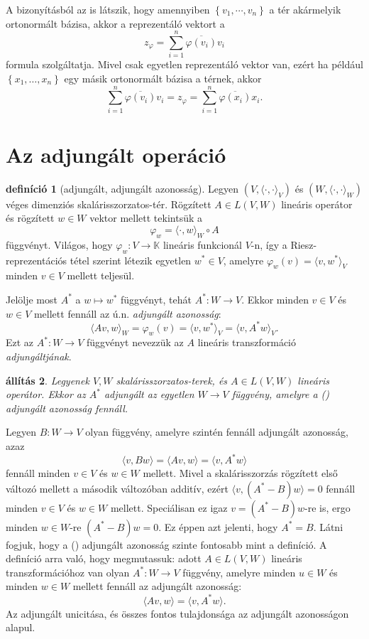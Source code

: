 \documentclass[9pt, a4paper, showtrims]{memoir}
\makeatletter
\renewenvironment{proof}[1][\proofname]
    {\par\pushQED{\qed}%
    \normalfont \topsep6\p@\@plus6\p@\relax
    \trivlist
    \item[\hskip\labelsep
        \itshape
    #1\@addpunct{:}]\ignorespaces}
    {\popQED\endtrivlist\@endpefalse}
\theoremstyle{plain}
\newtheorem{proposition}{állítás}[chapter]
\theoremstyle{remark}
\theoremstyle{definition}
\newtheorem{definition}[proposition]{definíció}
\newcommand{\ip}[2]{\langle#1,#2\rangle}
\makeatother
\begin{document}
A bizonyításból az is látszik, hogy amennyiben 
$\left\{ v_1,\cdots,v_n \right\}$ a tér akármelyik ortonormált bázisa,
akkor a reprezentáló vektort a 
\[
    z_\varphi=
    \sum_{i=1}^n\overline{\varphi\left( v_i \right)}v_i
\]
formula szolgáltatja.
Mivel csak egyetlen reprezentáló vektor van, ezért ha például 
$\left\{ x_1,\dots,x_n \right\}$ egy másik ortonormált bázisa a térnek,
akkor
\[
    \sum_{i=1}^n\overline{\varphi\left( v_i \right)}v_i
    =
    z_\varphi
    =
    \sum_{i=1}^n\overline{\varphi\left( x_i \right)}x_i.
\]
\section{Az adjungált operáció}
\begin{definition}[adjungált, adjungált azonosság]
Legyen $\left( V,\ip{\cdot}{\cdot}_V \right)$ és
$\left( W,\ip{\cdot}{\cdot}_W \right)$ véges dimenziós ska\-láris\-szor\-zatos-tér.
Rögzített $A\in L\left( V,W \right)$ lineáris operátor és rögzített $w\in W$ vektor mellett tekintsük a 
\[
    \varphi_w=
    \ip{\cdot}{w}_W\circ A
\]
függvényt. 
Világos, hogy $\varphi_w:V\to\mathbb{K}$ lineáris funkcionál $V$-n, 
így a Riesz-reprezentációs tétel szerint létezik egyetlen $w^\ast\in V$, 
amelyre
$\varphi_w\left( v \right)=\ip{v}{w^\ast}_V$ minden $v\in V$ mellett teljesül.

Jelölje most $A^\ast$ a $w\mapsto w^\ast$ függvényt, tehát
$A^\ast:W\to V$.
Ekkor minden $v\in V$ és $w\in V$ mellett fennáll az ú.n. \emph{adjungált azonosság}:
\[
    \ip{Av}{w}_W
    =
    \varphi_w\left( v \right)
    =
    \ip{v}{w^\ast}_V
    =
    \ip{v}{A^\ast w}_V.\tag{\dag}
\]
Ezt az $A^\ast:W\to V$ függvényt nevezzük az $A$ lineáris transzformáció \emph{adjungáltjának}.
\end{definition}
\begin{proposition}
    Legyenek $V,W$ skalárisszorzatos-terek, és $A\in L\left( V,W \right)$ lineáris operátor.
    Ekkor az $A^\ast$ adjungált az egyetlen $W\to V$ függvény,
    amelyre a (\dag) adjungált azonosság fennáll.
\end{proposition}
\begin{proof}
    Legyen $B:W\to V$ olyan függvény, amelyre szintén fennáll adjungált azonosság,
    azaz
    \[
        \ip{v}{Bw}
        =
        \ip{Av}{w}
        =
        \ip{v}{A^\ast w}
    \]
    fennáll minden $v\in V$ és $w\in W$ mellett.
    Mivel a skalárisszorzás rögzített első változó mellett a második változóban additív, 
    ezért 
    $\ip{v}{\left( A^\ast-B \right)w}=0$ fennáll minden $v\in V$ és $w\in W$ mellett.
    Speciálisan ez igaz $v=\left( A^\ast-B \right)w$-re is, ergo minden $w\in W$-re 
    $\left( A^\ast-B \right)w=0$.
    Ez éppen azt jelenti, hogy $A^\ast=B$.
\end{proof}
Látni fogjuk, hogy a (\dag) adjungált azonosság szinte fontosabb mint a definíció.
A definíció arra való, hogy megmutassuk: adott $A\in L\left( V,W \right)$ lineáris transzformációhoz van olyan 
$A^\ast:W\to V$ függvény, amelyre minden $u\in W$ és minden $w\in W$ mellett fennáll az adjungált azonosság:
\[
    \ip{Av}{w}
    =
    \ip{v}{A^\ast w}.
    \tag{\dag}
\]
Az adjungált unicitása, és összes fontos tulajdonsága az adjungált azonosságon alapul.
\end{document}
